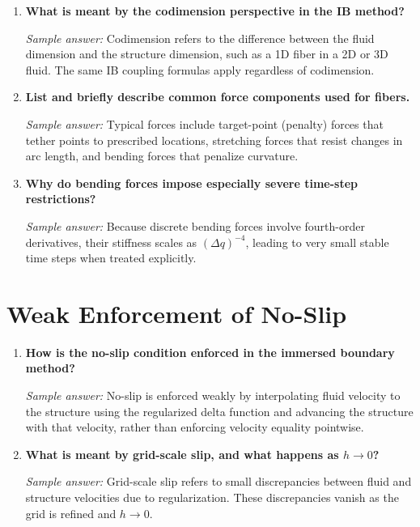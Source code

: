 \documentclass[11pt]{article}
\begin{document}
\begin{enumerate}[label=\arabic*., resume]

\item \textbf{What is meant by the codimension perspective in the IB method?}

\textit{Sample answer:}  
Codimension refers to the difference between the fluid dimension and the structure dimension, such as a 1D fiber in a 2D or 3D fluid. The same IB coupling formulas apply regardless of codimension.

\item \textbf{List and briefly describe common force components used for fibers.}

\textit{Sample answer:}  
Typical forces include target-point (penalty) forces that tether points to prescribed locations, stretching forces that resist changes in arc length, and bending forces that penalize curvature.

\item \textbf{Why do bending forces impose especially severe time-step restrictions?}

\textit{Sample answer:}  
Because discrete bending forces involve fourth-order derivatives, their stiffness scales as $(\Delta q)^{-4}$, leading to very small stable time steps when treated explicitly.

\end{enumerate}

\section*{Weak Enforcement of No-Slip}

\begin{enumerate}[label=\arabic*., resume]

\item \textbf{How is the no-slip condition enforced in the immersed boundary method?}

\textit{Sample answer:}  
No-slip is enforced weakly by interpolating fluid velocity to the structure using the regularized delta function and advancing the structure with that velocity, rather than enforcing velocity equality pointwise.

\item \textbf{What is meant by grid-scale slip, and what happens as $h \to 0$?}

\textit{Sample answer:}  
Grid-scale slip refers to small discrepancies between fluid and structure velocities due to regularization. These discrepancies vanish as the grid is refined and $h \to 0$.

\end{enumerate}
\end{document}
